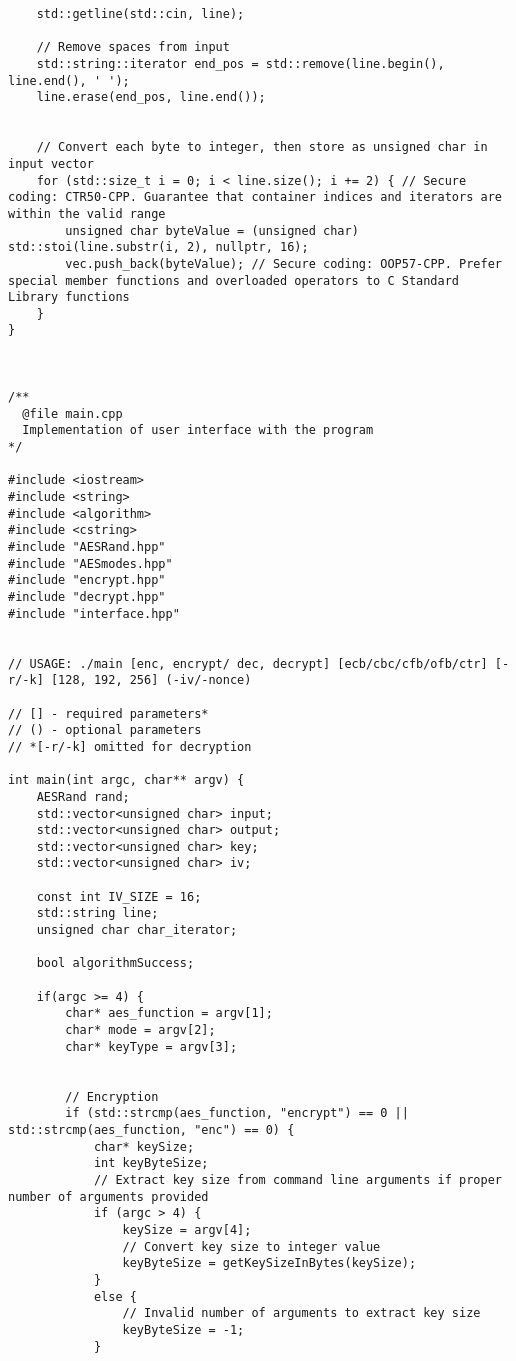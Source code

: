 \documentclass[a4paper,12pt]{article}
\begin{document}
{\begin{lstlisting}
    std::getline(std::cin, line);

    // Remove spaces from input
    std::string::iterator end_pos = std::remove(line.begin(), line.end(), ' ');
    line.erase(end_pos, line.end());


    // Convert each byte to integer, then store as unsigned char in input vector
    for (std::size_t i = 0; i < line.size(); i += 2) { // Secure coding: CTR50-CPP. Guarantee that container indices and iterators are within the valid range
        unsigned char byteValue = (unsigned char) std::stoi(line.substr(i, 2), nullptr, 16);
        vec.push_back(byteValue); // Secure coding: OOP57-CPP. Prefer special member functions and overloaded operators to C Standard Library functions
    }
}



/**
  @file main.cpp
  Implementation of user interface with the program
*/

#include <iostream>
#include <string>
#include <algorithm>
#include <cstring>
#include "AESRand.hpp"
#include "AESmodes.hpp"
#include "encrypt.hpp"
#include "decrypt.hpp"
#include "interface.hpp"


// USAGE: ./main [enc, encrypt/ dec, decrypt] [ecb/cbc/cfb/ofb/ctr] [-r/-k] [128, 192, 256] (-iv/-nonce)

// [] - required parameters*
// () - optional parameters
// *[-r/-k] omitted for decryption

int main(int argc, char** argv) {
    AESRand rand;
    std::vector<unsigned char> input;
    std::vector<unsigned char> output;
    std::vector<unsigned char> key;
    std::vector<unsigned char> iv;

    const int IV_SIZE = 16;
    std::string line;
    unsigned char char_iterator;

    bool algorithmSuccess;

    if(argc >= 4) {
        char* aes_function = argv[1];
        char* mode = argv[2];
        char* keyType = argv[3];


        // Encryption
        if (std::strcmp(aes_function, "encrypt") == 0 || std::strcmp(aes_function, "enc") == 0) {
            char* keySize;
            int keyByteSize;
            // Extract key size from command line arguments if proper number of arguments provided
            if (argc > 4) {
                keySize = argv[4];
                // Convert key size to integer value
                keyByteSize = getKeySizeInBytes(keySize);
            }
            else {
                // Invalid number of arguments to extract key size
                keyByteSize = -1;
            }


\end{lstlisting}}
\end{document}
